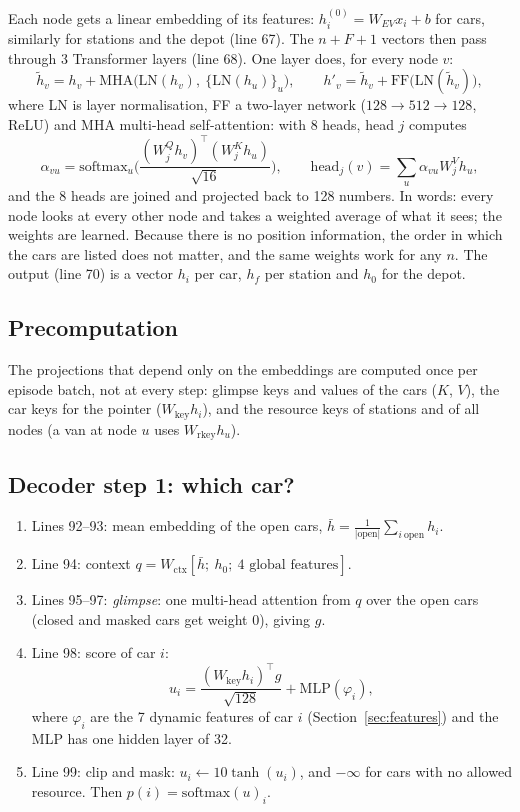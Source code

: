 Each node gets a linear embedding of its features: $h^{(0)}_i=W_{EV}x_i+b$ for cars, similarly for stations and the depot (line 67). The $n+F+1$ vectors then pass through 3 Transformer layers (line 68). One layer does, for every node $v$:
\[
\tilde h_v=h_v+\mathrm{MHA}\big(\mathrm{LN}(h_v),\ \{\mathrm{LN}(h_u)\}_u\big),\qquad
h'_v=\tilde h_v+\mathrm{FF}\big(\mathrm{LN}(\tilde h_v)\big),
\]
where LN is layer normalisation, FF a two-layer network ($128\to512\to128$, ReLU) and MHA multi-head self-attention: with 8 heads, head $j$ computes
\[
\alpha_{vu}=\mathrm{softmax}_u\Big(\frac{(W^Q_jh_v)^\top(W^K_jh_u)}{\sqrt{16}}\Big),\qquad \text{head}_j(v)=\sum_u\alpha_{vu}W^V_jh_u ,
\]
and the 8 heads are joined and projected back to 128 numbers. In words: every node looks at every other node and takes a weighted average of what it sees; the weights are learned. Because there is no position information, the order in which the cars are listed does not matter, and the same weights work for any $n$. The output (line 70) is a vector $h_i$ per car, $h_f$ per station and $h_0$ for the depot.

\subsection{Precomputation}


The projections that depend only on the embeddings are computed once per episode batch, not at every step: glimpse keys and values of the cars ($K$, $V$), the car keys for the pointer ($W_{\text{key}}h_i$), and the resource keys of stations and of all nodes (a van at node $u$ uses $W_{\text{rkey}}h_u$).

\subsection{Decoder step 1: which car?}


\begin{enumerate}
  \item Lines 92--93: mean embedding of the open cars, $\bar h=\frac{1}{|\text{open}|}\sum_{i\ \text{open}}h_i$.
  \item Line 94: context $q=W_{\text{ctx}}[\bar h;\ h_0;\ \text{4 global features}]$.
  \item Lines 95--97: \emph{glimpse}: one multi-head attention from $q$ over the open cars (closed and masked cars get weight 0), giving $g$.
  \item Line 98: score of car $i$:
  \[
  u_i=\frac{(W_{\text{key}}h_i)^\top g}{\sqrt{128}}+\mathrm{MLP}(\varphi_i),
  \]
  where $\varphi_i$ are the 7 dynamic features of car $i$ (Section~\ref{sec:features}) and the MLP has one hidden layer of 32.
  \item Line 99: clip and mask: $u_i\leftarrow10\tanh(u_i)$, and $-\infty$ for cars with no allowed resource. Then $p(i)=\mathrm{softmax}(u)_i$.
\end{enumerate}

